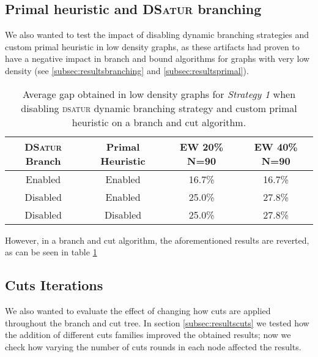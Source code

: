 \subsection{Primal heuristic and \textsc{DSatur} branching}

We also wanted to test the impact of disabling dynamic branching strategies and custom primal heuristic in low density graphs, as these artifacts had proven to have a negative impact in branch and bound algorithms for graphs with very low density (see \ref{subsec:resultsbranching} and \ref{subsec:resultsprimal}).

\begin{table}[h]
\centering
\begin{tabular}{|cc|c|c|}
\hline
\textsc{DSatur} Branch & Primal Heuristic & \multicolumn{1}{|c|}{EW 20\% N=90} & \multicolumn{1}{|c|}{EW 40\% N=90}
\\
\hline
Enabled & Enabled & 16.7\% & 16.7\%
\\
Disabled & Enabled & 25.0\% & 27.8\%
\\
Disabled & Disabled & 25.0\% & 27.8\%
\\
\hline 
 \end{tabular}
\caption{Average gap obtained in low density graphs for \textit{Strategy 1} when disabling \textsc{dsatur} dynamic branching strategy and custom primal heuristic on a branch and cut algorithm.}
\label{table:bnc:disableprimalbranchlow}
\end{table}

However, in a branch and cut algorithm, the aforementioned results are reverted, as can be seen in table \ref{table:bnc:disableprimalbranchlow}

\subsection{Cuts Iterations}

We also wanted to evaluate the effect of changing how cuts are applied throughout the branch and cut tree. In section \ref{subsec:resultscuts} we tested how the addition of different cuts families improved the obtained results; now we check how varying the number of cuts rounds in each node affected the results.

